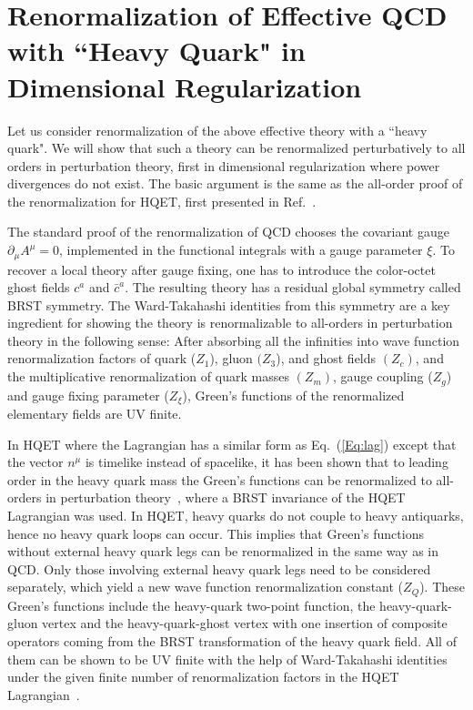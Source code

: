 \documentclass[prd,aps,twocolumn,preprintnumbers, showpacs, nofootinbib,superscriptaddress,notitlepage]{revtex4-1}
\begin{document}
\section{Renormalization of Effective QCD with ``Heavy Quark" in Dimensional Regularization}

Let us consider renormalization of the above effective theory with a ``heavy quark".
We will show that such a theory can be renormalized perturbatively to all orders in perturbation theory,
first in dimensional regularization where power divergences do not exist. The basic argument
is the same as the all-order proof of the renormalization for HQET, first
presented in Ref.~\cite{Bagan:1993zv}.

The standard proof of the renormalization of QCD chooses the covariant gauge $\partial_\mu A^\mu = 0$, implemented
in the functional integrals with a gauge parameter $\xi$. To recover a local theory after gauge
fixing, one has to introduce the color-octet ghost fields $c^a$ and $\bar c^a$. The resulting theory
has a residual global symmetry called BRST symmetry. The Ward-Takahashi identities
from this symmetry are a key ingredient for showing the theory is renormalizable to all-orders
in perturbation theory in the following sense: After absorbing all the infinities into
wave function renormalization factors of quark ($Z_1$), gluon $(Z_3$), and ghost fields $(Z_c)$, and the multiplicative
renormalization of quark masses $(Z_m)$, gauge coupling ($Z_g$) and gauge fixing parameter ($Z_\xi$),
Green's functions of the renormalized elementary fields are UV finite.

In HQET where the Lagrangian has a similar form as Eq.~(\ref{Eq:lag}) except that the vector $n^\mu$ is timelike instead of spacelike, it has been shown that to leading order in the heavy quark mass the Green's functions can be renormalized to all-orders in perturbation theory~\cite{Bagan:1993zv}, where a BRST invariance of the HQET Lagrangian was used. In HQET, heavy quarks do not couple to heavy antiquarks, hence no heavy quark loops can occur. This implies that Green's functions without external heavy quark legs can be renormalized in the same way as in QCD. Only those involving external heavy quark legs need to be considered separately, which yield
a new wave function renormalization constant ($Z_Q$). These Green's functions include the heavy-quark two-point function, the heavy-quark-gluon vertex and the heavy-quark-ghost vertex with one insertion of composite operators coming from the BRST transformation of the heavy quark field. All of them can be shown to be UV finite with the help of Ward-Takahashi identities under the given finite number of renormalization factors in the HQET Lagrangian~\cite{Bagan:1993zv}.
\end{document}
